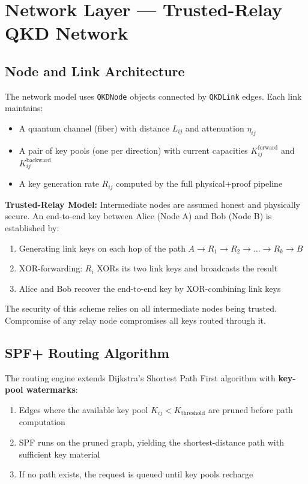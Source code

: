 \documentclass[11pt,a4paper,oneside]{report}
\begin{document}
\section{Network Layer — Trusted-Relay QKD Network}

\subsection{Node and Link Architecture}

The network model uses \texttt{QKDNode} objects connected by \texttt{QKDLink} edges. Each link maintains:

\begin{itemize}
\item A quantum channel (fiber) with distance $L_{ij}$ and attenuation $\eta_{ij}$
\item A pair of key pools (one per direction) with current capacities $K_{ij}^{\text{forward}}$ and $K_{ij}^{\text{backward}}$
\item A key generation rate $R_{ij}$ computed by the full physical+proof pipeline
\end{itemize}

\textbf{Trusted-Relay Model:} Intermediate nodes are assumed honest and physically secure. An end-to-end key between Alice (Node A) and Bob (Node B) is established by:
\begin{enumerate}
\item Generating link keys on each hop of the path $A \to R_1 \to R_2 \to \ldots \to R_k \to B$
\item XOR-forwarding: $R_i$ XORs its two link keys and broadcasts the result
\item Alice and Bob recover the end-to-end key by XOR-combining link keys
\end{enumerate}

The security of this scheme relies on all intermediate nodes being trusted. Compromise of any relay node compromises all keys routed through it.

\subsection{SPF+ Routing Algorithm}

The routing engine extends Dijkstra's Shortest Path First algorithm with \textbf{key-pool watermarks}:

\begin{enumerate}
\item Edges where the available key pool $K_{ij} < K_{\text{threshold}}$ are pruned before path computation
\item SPF runs on the pruned graph, yielding the shortest-distance path with sufficient key material
\item If no path exists, the request is queued until key pools recharge
\end{enumerate}
\end{document}

